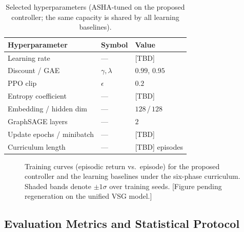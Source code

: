 \documentclass[lettersize,journal]{IEEEtran}
\begin{document}
\begin{table}[t]
  \centering
  \caption{Selected hyperparameters (ASHA-tuned on the proposed controller; the same capacity is shared by all learning baselines).}
  \label{tab:hyperparams}
  \begin{tabular}{lll}
    \hline
    Hyperparameter & Symbol & Value\\
    \hline
    Learning rate          & ---            & [TBD]\\
    Discount / GAE         & $\gamma,\lambda$ & $0.99$, $0.95$\\
    PPO clip               & $\epsilon$     & $0.2$\\
    Entropy coefficient    & ---            & [TBD]\\
    Embedding / hidden dim & ---            & $128$\,/\,$128$\\
    GraphSAGE layers       & ---            & $2$\\
    Update epochs / minibatch & ---         & [TBD]\\
    Curriculum length      & ---            & [TBD] episodes\\
    \hline
  \end{tabular}
\end{table}

\begin{figure}[t]
  \centering
  \caption{Training curves (episodic return vs.\ episode) for the proposed controller and the learning baselines under the six-phase curriculum. Shaded bands denote $\pm1\sigma$ over training seeds. [Figure pending regeneration on the unified VSG model.]}
  \label{fig:learning_curve}
\end{figure}

\subsection{Evaluation Metrics and Statistical Protocol}
\label{sec:casestudy:metrics}
\end{document}
